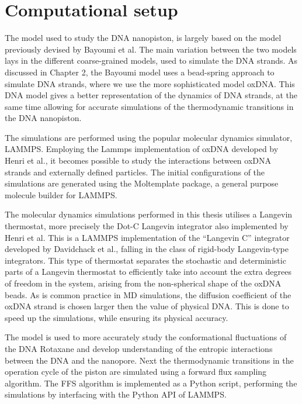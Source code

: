 \section{Computational setup}

The model used to study the DNA nanopiston, is largely based on the model
previously devised by Bayoumi et al. The main variation between the two models lays in
the different coarse-grained models, used to simulate the DNA strands. As discussed in
Chapter 2, the Bayoumi model uses a bead-spring approach to simulate DNA strands, where
we use the more sophisticated model oxDNA. This DNA model gives a better
representation of the dynamics of DNA strands, at the same time allowing for accurate
simulations of the thermodynamic transitions in the DNA nanopiston.

The simulations are performed using the popular molecular dynamics simulator,
LAMMPS.\cite{PLIMPTON19951} Employing the Lammps implementation of oxDNA developed by
Henri et al.,
it becomes possible to study the interactions between oxDNA strands and externally
defined particles.\cite{Henrich18} The initial configurations of the simulations are
generated using the
Moltemplate package, a general purpose molecule builder for LAMMPS.\cite{JEWETT2021}

The molecular dynamics simulations performed in this thesis utilises a Langevin
thermostat, more precisely the Dot-C Langevin integrator also implemented by Henri et
al. This is a LAMMPS implementation of the “Langevin C” integrator developed by
Davidchack et al., falling in the class of rigid-body Langevin-type
integrators.\cite{Davidchack2015}
This type of thermostat separates the stochastic and deterministic parts of a Langevin
thermostat to efficiently take into account the extra degrees of freedom in the system,
arising from the non-spherical shape of the oxDNA beads. As is common practice in MD
simulations, the diffusion coefficient of the oxDNA strand is chosen larger then the
value of physical DNA. This is done to speed up the simulations, while ensuring its
physical accuracy.

The model is used to more accurately study the conformational fluctuations of
the DNA Rotaxane and develop understanding of the entropic interactions between the DNA
and the nanopore. Next the thermodynamic transitions in the operation cycle of the piston
are simulated using a forward flux sampling algorithm. The FFS algorithm is implemented
as a Python script, performing the simulations by interfacing with the Python API of
LAMMPS.
